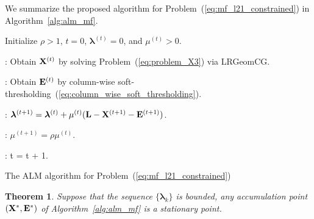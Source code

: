 \documentclass[letterpaper]{article}
\newtheorem{theorem}{Theorem}
\def\bE{{\bf E}}
\def\blambda{{\bm \lambda}}
\def\bL{{\bf L}}
\def\bX{{\bf X}}
\def\bX{{\bf X}}
\begin{document}
We summarize the proposed algorithm for Problem~(\ref{eq:mf_l21_constrained}) in Algorithm~\ref{alg:alm_mf}.
\begin{algorithm}[h!]
\begin{algorithmic}
\STATE Initialize $\rho > 1$, $t = 0$, $\blambda^{(t)} = 0$, and $\mu^{(t)} > 0$.



    : Obtain $\bX^{(t)}$ by solving Problem~(\ref{eq:problem_X3}) via LRGeomCG.

    : Obtain $\bE^{(t)}$ by column-wise soft-thresholding~(\ref{eq:column_wise_soft_thresholding}).

  \ENDWHILE

  : $\blambda^{(t+1)} = \blambda^{(t)} + \mu^{(t)} (\bL - \bX^{(t+1)} - \bE^{(t+1)})$.

  : $\mu^{(t+1)} = \rho \mu^{(t)}$.

  : t = t + 1.

\ENDWHILE

\end{algorithmic}
\caption{The ALM algorithm for Problem~(\ref{eq:mf_l21_constrained})}
\label{alg:alm_mf}
\end{algorithm}



\begin{theorem}\label{theorem:alm_convergence}
  Suppose that the sequence $\{ \blambda_{k} \}$ is bounded, any accumulation point $(\bX^*, \bE^*)$ of Algorithm~\ref{alg:alm_mf} is a stationary point.
\end{theorem}
\end{document}
